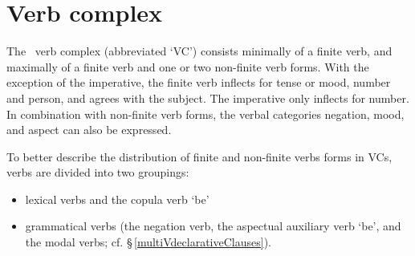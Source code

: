 \section{Verb complex}\label{verbComplex}
The \PS\ verb complex (abbreviated ‘VC’) consists minimally of a finite verb, and maximally of a finite verb and one or two non-finite verb forms. 
With the exception of the imperative, the finite verb inflects for tense or mood, number and person, and agrees with the subject. 
The imperative only inflects for number. %
%
In combination with non-finite verb forms, the verbal categories negation, mood, and aspect can also be expressed. 

To better describe the distribution of finite and non-finite verbs forms in VCs, verbs are divided into two groupings: %
\begin{itemize}
\item{lexical verbs and the copula verb  ‘be’}
\item{grammatical verbs (the negation verb, the aspectual auxiliary verb  ‘be’, and the modal verbs; cf. §\,\ref{multiVdeclarativeClauses}).}
\end{itemize} 

